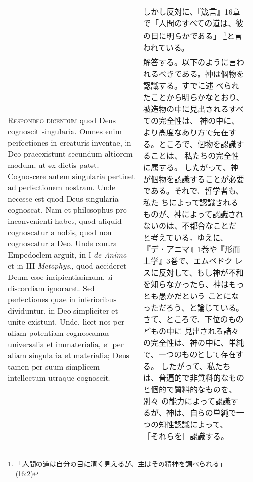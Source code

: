 \documentclass[10pt]{jsarticle} %
\begin{document}
\begin{longtable}{p{21em}p{21em}}
&

しかし反対に、『箴言』16章で「人間のすべての道は、彼の目に明らかである」
\footnote{「人間の道は自分の目に清く見えるが、主はその精神を調べられる」
(16:2)}と言われている。

\\


{\scshape Respondeo dicendum} quod Deus cognoscit singularia. Omnes enim
perfectiones in creaturis inventae, in Deo praeexistunt secundum
altiorem modum, ut ex dictis patet. Cognoscere autem singularia pertinet
ad perfectionem nostram. Unde necesse est quod Deus singularia
cognoscat. Nam et philosophus pro inconvenienti habet, quod aliquid
cognoscatur a nobis, quod non cognoscatur a Deo. Unde contra Empedoclem
arguit, in I {\itshape de Anima} et in III {\itshape Metaphys}., quod
accideret Deum esse insipientissimum, si discordiam ignoraret. Sed
perfectiones quae in inferioribus dividuntur, in Deo simpliciter et
unite existunt. Unde, licet nos per aliam potentiam cognoscamus
universalia et immaterialia, et per aliam singularia et materialia; Deus
tamen per suum simplicem intellectum utraque cognoscit.


&

解答する。以下のように言われるべきである。神は個物を認識する。すでに述
べられたことから明らかなとおり、被造物の中に見出されるすべての完全性は、
神の中に、より高度なあり方で先在する。ところで、個物を認識することは、
私たちの完全性に属する。
したがって、神が個物を認識することが必要である。それで、哲学者も、私た
ちによって認識されるものが、神によって認識されないのは、不都合なことだ
と考えている。ゆえに、『デ・アニマ』1巻や『形而上学』3巻で、エムペドク
レスに反対して、もし神が不和を知らなかったら、神はもっとも愚かだという
ことになっただろう、と論じている。さて、ところで、下位のものどもの中に
見出される諸々の完全性は、神の中に、単純で、一つのものとして存在する。
したがって、私たちは、普遍的で非質料的なものと個的で質料的なものを、別々
の能力によって認識するが、神は、自らの単純で一つの知性認識によって、
［それらを］認識する。


\end{longtable}
\end{document}
